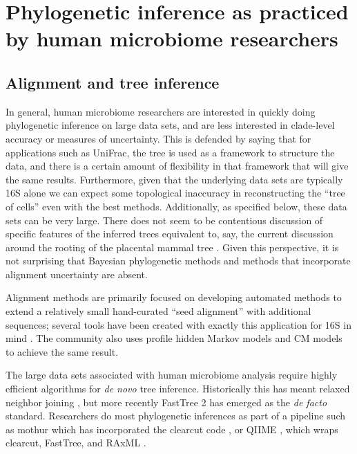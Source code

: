 \documentclass{amsart}
\begin{document}
\section{Phylogenetic inference as practiced by human microbiome researchers}

\subsection{Alignment and tree inference}
In general, human microbiome researchers are interested in quickly doing phylogenetic inference on large data sets, and are less interested in clade-level accuracy or measures of uncertainty.
This is defended by saying that for applications such as UniFrac, the tree is used as a framework to structure the data, and there is a certain amount of flexibility in that framework that will give the same results.
Furthermore, given that the underlying data sets are typically 16S alone we can expect some topological inaccuracy in reconstructing the ``tree of cells'' even with the best methods.
Additionally, as specified below, these data sets can be very large.
There does not seem to be contentious discussion of specific features of the inferred trees equivalent to, say, the current discussion around the rooting of the placental mammal tree \citep{morgan2013heterogeneous,romiguier2013less}.
Given this perspective, it is not surprising that Bayesian phylogenetic methods and methods that incorporate alignment uncertainty are absent.

Alignment methods are primarily focused on developing automated methods to extend a relatively small hand-curated ``seed alignment'' with additional sequences; several tools have been created with exactly this application for 16S in mind \citep{desantis2006nast,caporaso2010pynast,pruesse2012sina}.
The community also uses profile hidden Markov models \citep{eddy1998profile} and CM models \citep{nawrocki2009infernal,nawrocki2009structural} to achieve the same result.

The large data sets associated with human microbiome analysis require highly efficient algorithms for \emph{de novo} tree inference.
Historically this has meant relaxed neighbor joining \citep{evans2006relaxed}, but more recently FastTree 2 \citep{price2010fasttree} has emerged as the \textit{de facto} standard.
Researchers do most phylogenetic inferences as part of a pipeline such as mothur \citep{schloss2009introducing} which has incorporated the clearcut code \citep{sheneman2006clearcut}, or QIIME \citep{caporaso2010qiime}, which wraps clearcut, FastTree, and RAxML \citep{Stamatakis2006-yz}.
\end{document}
